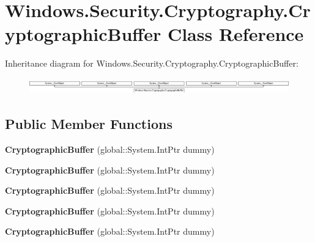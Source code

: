 \hypertarget{class_windows_1_1_security_1_1_cryptography_1_1_cryptographic_buffer}{}\section{Windows.\+Security.\+Cryptography.\+Cryptographic\+Buffer Class Reference}
\label{class_windows_1_1_security_1_1_cryptography_1_1_cryptographic_buffer}
Inheritance diagram for Windows.\+Security.\+Cryptography.\+Cryptographic\+Buffer\+:\begin{figure}[H]
\begin{center}
\leavevmode
\includegraphics[height=0.693498cm]{class_windows_1_1_security_1_1_cryptography_1_1_cryptographic_buffer}
\end{center}
\end{figure}
\subsection*{Public Member Functions}
\begin{DoxyCompactItemize}
\item 
\mbox{\label{class_windows_1_1_security_1_1_cryptography_1_1_cryptographic_buffer_aa05d27a97403164e74b8fa9e8e7b7bcd}} 
{\bfseries Cryptographic\+Buffer} (global\+::\+System.\+Int\+Ptr dummy)
\item 
\mbox{\label{class_windows_1_1_security_1_1_cryptography_1_1_cryptographic_buffer_aa05d27a97403164e74b8fa9e8e7b7bcd}} 
{\bfseries Cryptographic\+Buffer} (global\+::\+System.\+Int\+Ptr dummy)
\item 
\mbox{\label{class_windows_1_1_security_1_1_cryptography_1_1_cryptographic_buffer_aa05d27a97403164e74b8fa9e8e7b7bcd}} 
{\bfseries Cryptographic\+Buffer} (global\+::\+System.\+Int\+Ptr dummy)
\item 
\mbox{\label{class_windows_1_1_security_1_1_cryptography_1_1_cryptographic_buffer_aa05d27a97403164e74b8fa9e8e7b7bcd}} 
{\bfseries Cryptographic\+Buffer} (global\+::\+System.\+Int\+Ptr dummy)
\item 
\mbox{\label{class_windows_1_1_security_1_1_cryptography_1_1_cryptographic_buffer_aa05d27a97403164e74b8fa9e8e7b7bcd}} 
{\bfseries Cryptographic\+Buffer} (global\+::\+System.\+Int\+Ptr dummy)
\end{DoxyCompactItemize}
